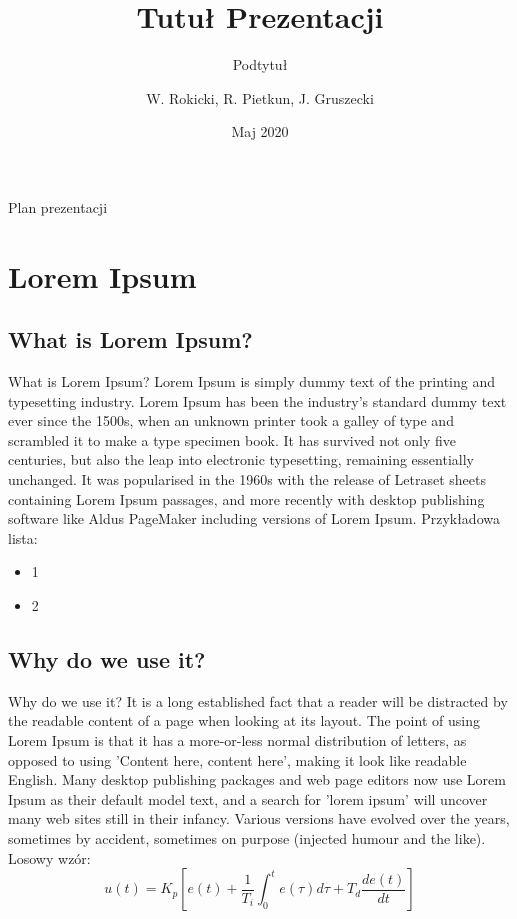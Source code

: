 \documentclass{beamer}
\title{Tutuł Prezentacji}
\subtitle{Podtytuł}
\author{W. Rokicki, R. Pietkun, J. Gruszecki}
\date{Maj 2020}
\begin{document}
\begin{frame}
\titlepage
\end{frame}

\begin{frame}{Plan prezentacji}
\tableofcontents    
\end{frame}

\section{Lorem Ipsum}

\subsection{What is Lorem Ipsum?}
	\begin{frame}{What is Lorem Ipsum?}
	Lorem Ipsum is simply dummy text of the printing and typesetting industry. Lorem Ipsum has been the industry's standard dummy text ever since the 1500s, when an unknown printer took a galley of type and scrambled it to make a type specimen book. 
	\newline
	It has survived not only five centuries, but also the leap into electronic typesetting, remaining essentially unchanged. It was popularised in the 1960s with the release of Letraset sheets containing Lorem Ipsum passages, and more recently with desktop publishing software like Aldus PageMaker including versions of Lorem Ipsum.
	\newline
	Przykładowa lista:
	\begin{itemize}
	    \item 1
	    \item 2
	\end{itemize}
\end{frame}

\subsection{Why do we use it?}
\begin{frame}{Why do we use it?}
	It is a long established fact that a reader will be distracted by the readable content of a page when looking at its layout. The point of using Lorem Ipsum is that it has a more-or-less normal distribution of letters, as opposed to using 'Content here, content here', making it look like readable English. Many desktop publishing packages and web page editors now use Lorem Ipsum as their default model text, and a search for 'lorem ipsum' will uncover many web sites still in their infancy. Various versions have evolved over the years, sometimes by accident, sometimes on purpose (injected humour and the like).
	\newline
	Losowy wzór:
	\begin{equation}
	    u(t) = K_p[e(t) + \frac{1}{T_i}\int^t_0e(\tau)d\tau+T_d\frac{de(t)}{dt}]
	\end{equation}
\end{frame}
\end{document}
